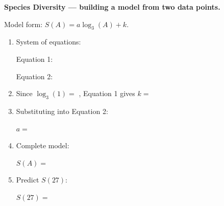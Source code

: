 \documentclass[10pt]{article}
\begin{document}
\vspace{0.1in}

\begin{tcolorbox}[colback=white, colframe=black!40,
    title=\textbf{Tier A --- Approaching Proficiency},
    fonttitle=\bfseries, arc=2mm, left=3mm, right=3mm, top=2mm, bottom=2mm]

\textbf{Species Diversity --- building a model from two data points.}

\vspace{4pt}
Model form: $S(A) = a\log_3(A) + k$.

\begin{enumerate}[leftmargin=1.8em, itemsep=10pt]

\item System of equations:

\vspace{4pt}
Equation 1: 

\vspace{4pt}
Equation 2: 

\item Since $\log_3(1) = $ , Equation 1 gives $k = $ 

\item Substituting into Equation 2:


$a = $ 

\item Complete model:

\vspace{4pt}
$S(A) = $ 

\item Predict $S(27)$:

\vspace{4pt}
$S(27) = $ 

\end{enumerate}
\end{tcolorbox}

\vspace{0.1in}
\end{document}
